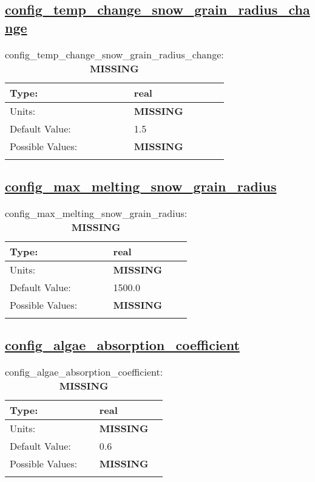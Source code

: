 \subsection[config\_temp\_change\_snow\_grain\_radius\_change]{\hyperref[sec:nm_tab_shortwave]{config\_temp\_change\_snow\_grain\_radius\_change}}
\label{subsec:nm_sec_config_temp_change_snow_grain_radius_change}
\begin{center}
\begin{longtable}{| p{2.0in} || p{4.0in} |}
    \hline
    Type: & real \\
    \hline
    Units: & {\bf \color{red} MISSING} \\
    \hline
    Default Value: & 1.5 \\
    \hline
    Possible Values: & {\bf \color{red} MISSING} \\
    \hline
    \caption{config\_temp\_change\_snow\_grain\_radius\_change: {\bf \color{red} MISSING}}
\end{longtable}
\end{center}
\subsection[config\_max\_melting\_snow\_grain\_radius]{\hyperref[sec:nm_tab_shortwave]{config\_max\_melting\_snow\_grain\_radius}}
\label{subsec:nm_sec_config_max_melting_snow_grain_radius}
\begin{center}
\begin{longtable}{| p{2.0in} || p{4.0in} |}
    \hline
    Type: & real \\
    \hline
    Units: & {\bf \color{red} MISSING} \\
    \hline
    Default Value: & 1500.0 \\
    \hline
    Possible Values: & {\bf \color{red} MISSING} \\
    \hline
    \caption{config\_max\_melting\_snow\_grain\_radius: {\bf \color{red} MISSING}}
\end{longtable}
\end{center}
\subsection[config\_algae\_absorption\_coefficient]{\hyperref[sec:nm_tab_shortwave]{config\_algae\_absorption\_coefficient}}
\label{subsec:nm_sec_config_algae_absorption_coefficient}
\begin{center}
\begin{longtable}{| p{2.0in} || p{4.0in} |}
    \hline
    Type: & real \\
    \hline
    Units: & {\bf \color{red} MISSING} \\
    \hline
    Default Value: & 0.6 \\
    \hline
    Possible Values: & {\bf \color{red} MISSING} \\
    \hline
    \caption{config\_algae\_absorption\_coefficient: {\bf \color{red} MISSING}}
\end{longtable}
\end{center}
